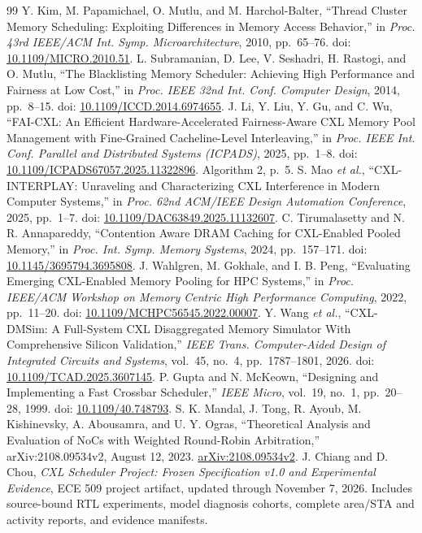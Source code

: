 \documentclass[10pt,letterpaper,twocolumn]{article}
\begin{document}
\begin{thebibliography}{99}
 Y. Kim, M. Papamichael, O. Mutlu, and M. Harchol-Balter, ``Thread Cluster Memory Scheduling: Exploiting Differences in Memory Access Behavior,'' in \emph{Proc. 43rd IEEE/ACM Int. Symp. Microarchitecture}, 2010, pp.~65--76. doi: \href{https://doi.org/10.1109/MICRO.2010.51}{10.1109/MICRO.2010.51}.
 L. Subramanian, D. Lee, V. Seshadri, H. Rastogi, and O. Mutlu, ``The Blacklisting Memory Scheduler: Achieving High Performance and Fairness at Low Cost,'' in \emph{Proc. IEEE 32nd Int. Conf. Computer Design}, 2014, pp.~8--15. doi: \href{https://doi.org/10.1109/ICCD.2014.6974655}{10.1109/ICCD.2014.6974655}.
 J. Li, Y. Liu, Y. Gu, and C. Wu, ``FAI-CXL: An Efficient Hardware-Accelerated Fairness-Aware CXL Memory Pool Management with Fine-Grained Cacheline-Level Interleaving,'' in \emph{Proc. IEEE Int. Conf. Parallel and Distributed Systems (ICPADS)}, 2025, pp.~1--8. doi: \href{https://doi.org/10.1109/ICPADS67057.2025.11322896}{10.1109/ICPADS67057.2025.11322896}. Algorithm 2, p.~5.
 S. Mao \emph{et al.}, ``CXL-INTERPLAY: Unraveling and Characterizing CXL Interference in Modern Computer Systems,'' in \emph{Proc. 62nd ACM/IEEE Design Automation Conference}, 2025, pp.~1--7. doi: \href{https://doi.org/10.1109/DAC63849.2025.11132607}{10.1109/DAC63849.2025.11132607}.
 C. Tirumalasetty and N. R. Annapareddy, ``Contention Aware DRAM Caching for CXL-Enabled Pooled Memory,'' in \emph{Proc. Int. Symp. Memory Systems}, 2024, pp.~157--171. doi: \href{https://doi.org/10.1145/3695794.3695808}{10.1145/3695794.3695808}.
 J. Wahlgren, M. Gokhale, and I. B. Peng, ``Evaluating Emerging CXL-Enabled Memory Pooling for HPC Systems,'' in \emph{Proc. IEEE/ACM Workshop on Memory Centric High Performance Computing}, 2022, pp.~11--20. doi: \href{https://doi.org/10.1109/MCHPC56545.2022.00007}{10.1109/MCHPC56545.2022.00007}.
 Y. Wang \emph{et al.}, ``CXL-DMSim: A Full-System CXL Disaggregated Memory Simulator With Comprehensive Silicon Validation,'' \emph{IEEE Trans. Computer-Aided Design of Integrated Circuits and Systems}, vol.~45, no.~4, pp.~1787--1801, 2026. doi: \href{https://doi.org/10.1109/TCAD.2025.3607145}{10.1109/TCAD.2025.3607145}.
 P. Gupta and N. McKeown, ``Designing and Implementing a Fast Crossbar Scheduler,'' \emph{IEEE Micro}, vol.~19, no.~1, pp.~20--28, 1999. doi: \href{https://doi.org/10.1109/40.748793}{10.1109/40.748793}.
 S. K. Mandal, J. Tong, R. Ayoub, M. Kishinevsky, A. Abousamra, and U. Y. Ogras, ``Theoretical Analysis and Evaluation of NoCs with Weighted Round-Robin Arbitration,'' arXiv:2108.09534v2, August 12, 2023. \href{https://arxiv.org/abs/2108.09534v2}{arXiv:2108.09534v2}.
 J. Chiang and D. Chou, \emph{CXL Scheduler Project: Frozen Specification v1.0 and Experimental Evidence}, ECE 509 project artifact, updated through November 7, 2026. Includes source-bound RTL experiments, model diagnosis cohorts, complete area/STA and activity reports, and evidence manifests.
\end{thebibliography}
\endgroup
\end{document}
